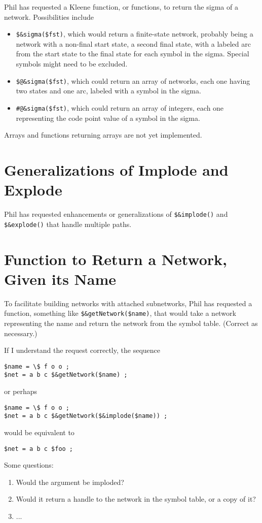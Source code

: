 \documentclass[letterpaper,12pt]{article}
\begin{document}
Phil has requested a Kleene function, or functions, to return the sigma of
a network.  Possibilities include

\begin{itemize}
\item
\verb!$&sigma($fst)!, which would return a finite-state network, probably
being a network with a non-final start state, a second final state, with a
labeled
arc from the start state to the final state for each symbol in the sigma.
Special symbols might need to be excluded.

\item
\verb!$@&sigma($fst)!, which could return an array of networks, each one
having two states and one arc, labeled with a symbol in the sigma.

\item
\verb!#@&sigma($fst)!, which could return an array of integers, each one
representing the code point value of a symbol in the sigma.

\end{itemize}

\noindent
Arrays and functions returning arrays are not yet implemented.

\section{Generalizations of Implode and Explode}

Phil has requested enhancements or generalizations of \verb!$&implode()!
and \verb!$&explode()! that handle multiple paths.

\section{Function to Return a Network, Given its Name}

To facilitate building networks with attached subnetworks, Phil has
requested a function, something like \verb!$&getNetwork($name)!, that would
take a network representing the name and return the network from the symbol
table.  (Correct as necessary.)

If I understand the request correctly, the sequence

\begin{Verbatim}[fontsize=\small]
$name = \$ f o o ;
$net = a b c $&getNetwork($name) ;
\end{Verbatim}

\noindent
or perhaps

\begin{Verbatim}[fontsize=\small]
$name = \$ f o o ;
$net = a b c $&getNetwork($&implode($name)) ;
\end{Verbatim}

\noindent
would be equivalent to

\begin{Verbatim}[fontsize=\small]
$net = a b c $foo ;
\end{Verbatim}

Some questions:

\begin{enumerate}
\item
Would the argument be imploded?
\item
Would it return a handle to the network in the symbol table, or a copy of
it?
\item
...
\end{enumerate}
\end{document}
